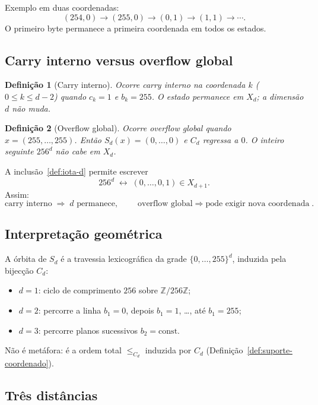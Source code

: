 \documentclass[11pt,a4paper]{article}
\newtheorem{definicao}{Definição}
\begin{document}
Exemplo em duas coordenadas:
\[
(254,0)\to(255,0)\to(0,1)\to(1,1)\to\cdots.
\]
O primeiro byte permanece a primeira coordenada em todos os estados.

\subsection{Carry interno versus overflow global}

\begin{definicao}[Carry interno]
\label{def:carry-interno}
Ocorre \emph{carry interno} na coordenada \(k\) (\(0\le k\le d-2\)) quando \(c_k=1\) e \(b_k=255\). O estado permanece em \(X_d\); a dimensão \(d\) não muda.
\end{definicao}

\begin{definicao}[Overflow global]
\label{def:overflow}
Ocorre \emph{overflow global} quando \(x=(255,\dots,255)\). Então \(S_d(x)=(0,\dots,0)\) e \(C_d\) regressa a \(0\). O inteiro seguinte \(256^d\) não cabe em \(X_d\).
\end{definicao}

A inclusão~\eqref{def:iota-d} permite escrever
\[
256^d\;\longleftrightarrow\;(0,\dots,0,1)\in X_{d+1}.
\]
Assim:
\[
\boxed{\text{carry interno}\;\Rightarrow\; d\text{ permanece}},
\qquad
\boxed{\text{overflow global}\;\Rightarrow\;\text{pode exigir nova coordenada}}.
\]

\subsection{Interpretação geométrica}

A órbita de \(S_d\) é a travessia lexicográfica da grade \(\{0,\dots,255\}^d\), induzida pela bijecção \(C_d\):
\begin{itemize}[leftmargin=1.5em]
\item \(d=1\): ciclo de comprimento \(256\) sobre \(\mathbb Z/256\mathbb Z\);
\item \(d=2\): percorre a linha \(b_1=0\), depois \(b_1=1\), \ldots, até \(b_1=255\);
\item \(d=3\): percorre planos sucessivos \(b_2=\mathrm{const}\).
\end{itemize}
Não é metáfora: é a ordem total \(\le_{C_d}\) induzida por \(C_d\) (Definição~\ref{def:suporte-coordenado}).

\subsection{Três distâncias}
\end{document}
